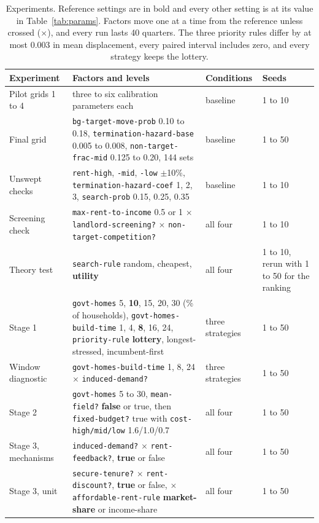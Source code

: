 \documentclass[10pt,a4paper]{article}
\begin{document}
\begin{table}[tp]
\centering
\caption{Experiments. Reference settings are in bold and every other setting is at its value in Table~\ref{tab:params}. Factors move one at a time from the reference unless crossed ($\times$), and every run lasts 40 quarters. The three priority rules differ by at most 0.003 in mean displacement, every paired interval includes zero, and every strategy keeps the lottery.}
\label{tab:levels}
\small
\begin{tabular}{L{3.0cm}L{7.3cm}L{2.5cm}L{1.4cm}}
\toprule
\textbf{Experiment} & \textbf{Factors and levels} & \textbf{Conditions} & \textbf{Seeds} \\
\midrule
Pilot grids 1 to 4 & three to six calibration parameters each & baseline & 1 to 10 \\
Final grid & \texttt{bg-target-move-prob} 0.10 to 0.18, \texttt{termination-hazard-base} 0.005 to 0.008, \texttt{non-target-frac-mid} 0.125 to 0.20, 144 sets & baseline & 1 to 50 \\
Unswept checks & \texttt{rent-high}, \texttt{-mid}, \texttt{-low} $\pm$10\%, \texttt{termination-hazard-coef} 1, 2, 3, \texttt{search-prob} 0.15, 0.25, 0.35 & baseline & 1 to 10 \\
Screening check & \texttt{max-rent-to-income} 0.5 or 1 $\times$ \texttt{landlord-screening?} $\times$ \texttt{non-target-competition?} & all four & 1 to 10 \\
Theory test & \texttt{search-rule} random, cheapest, \textbf{utility} & all four & 1 to 10, rerun with 1 to 50 for the ranking \\
Stage 1 & \texttt{govt-homes} 5, \textbf{10}, 15, 20, 30 (\% of households), \texttt{govt-homes-build-time} 1, 4, \textbf{8}, 16, 24, \texttt{priority-rule} \textbf{lottery}, longest-stressed, incumbent-first & three strategies & 1 to 50 \\
Window diagnostic & \texttt{govt-homes-build-time} 1, 8, 24 $\times$ \texttt{induced-demand?} & three strategies & 1 to 50 \\
Stage 2 & \texttt{govt-homes} 5 to 30, \texttt{mean-field?} \textbf{false} or true, then \texttt{fixed-budget?} true with \texttt{cost-high/mid/low} 1.6/1.0/0.7 & all four & 1 to 50 \\
Stage 3, mechanisms & \texttt{induced-demand?} $\times$ \texttt{rent-feedback?}, \textbf{true} or false & all four & 1 to 50 \\
Stage 3, unit & \texttt{secure-tenure?} $\times$ \texttt{rent-discount?}, \textbf{true} or false, $\times$ \texttt{affordable-rent-rule} \textbf{market-share} or income-share & all four & 1 to 50 \\

\end{tabular}
\end{table}
\end{document}
